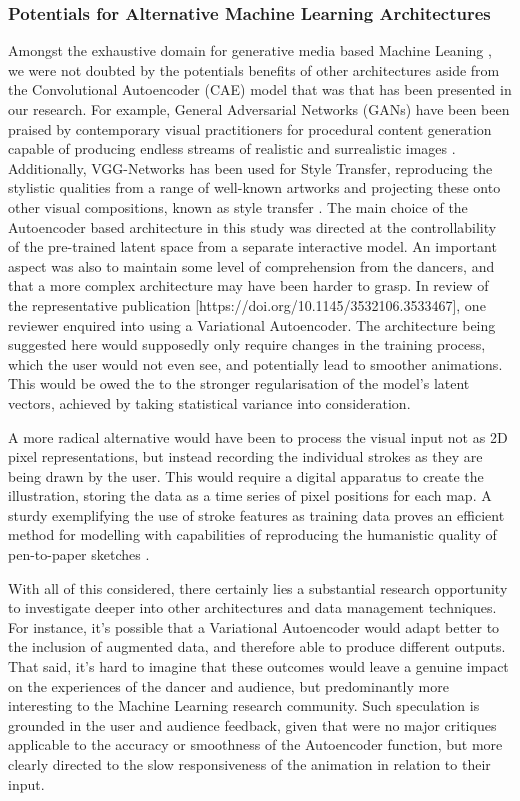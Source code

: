 \subsubsection{Potentials for Alternative Machine Learning Architectures}

Amongst the exhaustive domain for generative media based Machine Leaning \cite{hertzmann_aesthetics_2019}, we were not doubted by the potentials benefits of other architectures aside from the Convolutional Autoencoder (CAE) model that was that has been presented in our research. For example, General Adversarial Networks (GANs) have been been praised by contemporary visual practitioners for procedural content generation capable of producing endless streams of realistic and surrealistic images \cite{karras_style-based_2019,Elgammal2017CANCA}. Additionally, VGG-Networks has been used for Style Transfer, reproducing the stylistic qualities from a range of well-known artworks and projecting these onto other visual compositions, known as style transfer \cite{gatys_neural_2015}. The main choice of the Autoencoder based architecture in this study was directed at the controllability of the pre-trained latent space from a separate interactive model. An important aspect was also to maintain some level of comprehension from the dancers, and that a more complex architecture may have been harder to grasp. 
In review of the representative publication [https://doi.org/10.1145/3532106.3533467], one reviewer enquired into using a Variational Autoencoder. The architecture being suggested here would supposedly only require changes in the training process, which the user would not even see, and potentially lead to smoother animations. This would be owed the to the stronger regularisation of the model's latent vectors, achieved by taking statistical variance into consideration.

A more radical alternative would have been to process the visual input not as 2D pixel representations, but instead recording the individual strokes as they are being drawn by the user. This would require a digital apparatus to create the illustration, storing the data as a time series of pixel positions for each map. A sturdy exemplifying the use of stroke features as training data proves an efficient method for modelling with capabilities of reproducing the humanistic quality of pen-to-paper sketches \cite{ha_neural_2017}.

With all of this considered, there certainly lies a substantial research opportunity to investigate deeper into other architectures and data management techniques. For instance, it's possible that a Variational Autoencoder would adapt better to the inclusion of augmented data, and therefore able to produce different outputs. That said, it's hard to imagine that these outcomes would leave a genuine impact on the experiences of the dancer and audience, but predominantly more interesting to the Machine Learning research community. Such speculation is grounded in the user and audience feedback, given that were no major critiques applicable to the accuracy or smoothness of the Autoencoder function, but more clearly directed to the slow responsiveness of the animation in relation to their input.